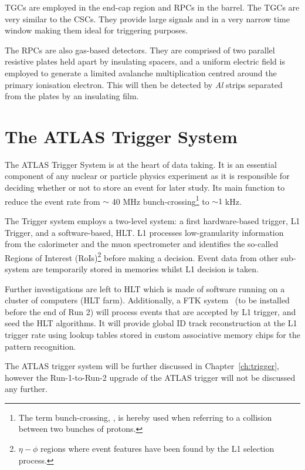 			\acp{TGC} are employed in the end-cap region and \acp{RPC} in the barrel. The \acp{TGC} are very similar to the \acp{CSC}. They provide large signals and in a very narrow time window making them ideal for triggering purposes.

			The \acp{RPC} are also gas-based detectors. They are comprised of two parallel resistive plates held apart by insulating spacers, and a uniform electric field is employed to generate a limited avalanche multiplication centred around the primary ionisation electron. This will then be detected by \emph{Al} strips separated from the plates by an insulating film.




	\section{The ATLAS Trigger System}
	\label{sec:trigSyst}

		The \ac{ATLAS} Trigger System is at the heart of data taking. It is an essential component of any nuclear or particle physics experiment as it is responsible for deciding whether or not to store an event for later study. Its main function to reduce the event rate from $\sim$ 40 MHz bunch-crossing\footnote{The term bunch-crossing, \mubar, is hereby used when referring to a collision between two bunches of protons.} to $\sim 1$ kHz.

		The Trigger system employs a two-level system: a first hardware-based trigger, \ac{L1} Trigger, and a software-based, \ac{HLT}. \ac{L1} processes low-granularity information from the calorimeter and the muon spectrometer and identifies the so-called Regions of Interest (RoIs)\footnote{$\eta - \phi$ regions where event features have been found by the \ac{L1} selection process.} before making a decision. Event data from other sub-system are temporarily stored in memories whilst \ac{L1} decision is taken.
		
		Further investigations are left to \ac{HLT} which is made of software running on a cluster of computers (\ac{HLT} farm). Additionally, a \ac{FTK} system~\cite{FTKTDR} (to be installed before the end of Run 2) will process events that are accepted by \ac{L1} trigger, and seed the \ac{HLT} algorithms. It will provide global \ac{ID} track reconstruction at the \ac{L1} trigger rate using lookup tables stored in custom associative memory chips for the pattern recognition.
		
		The \ac{ATLAS} trigger system will be further discussed in Chapter~\ref{ch:trigger}, however the Run-1-to-Run-2 upgrade of the \ac{ATLAS} trigger will not be discussed any further.